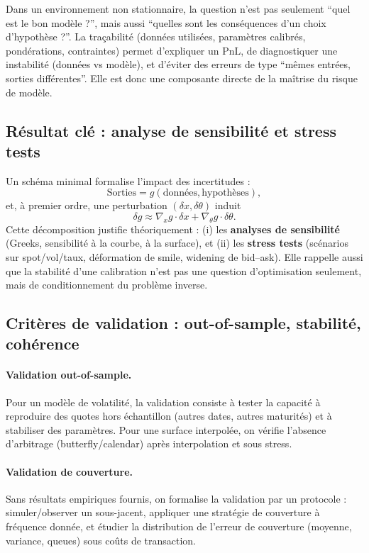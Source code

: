 \documentclass[11pt,a4paper]{article}
\newcommand{\1}{\mathbf{1}}
\begin{document}
Dans un environnement non stationnaire, la question n'est pas seulement ``quel est le bon mod\`ele ?'', mais aussi
``quelles sont les cons\'equences d'un choix d'hypoth\`ese ?''. La tra\c{c}abilit\'e (donn\'ees utilis\'ees, param\`etres calibr\'es,
pond\'erations, contraintes) permet d'expliquer un PnL, de diagnostiquer une instabilit\'e (donn\'ees vs mod\`ele), et d'\'eviter des erreurs
de type ``m\^emes entr\'ees, sorties diff\'erentes''. Elle est donc une composante directe de la ma\^{i}trise du risque de mod\`ele.

\subsection{R\'esultat cl\'e : analyse de sensibilit\'e et stress tests}

Un sch\'ema minimal formalise l'impact des incertitudes :
\[
\text{Sorties} = g(\text{donn\'ees},\text{hypoth\`eses}),
\]
et, \`a premier ordre, une perturbation $(\delta x,\delta\theta)$ induit
\[
\delta g \approx \nabla_x g \cdot \delta x + \nabla_\theta g \cdot \delta\theta.
\]
Cette d\'ecomposition justifie th\'eoriquement : (i) les \textbf{analyses de sensibilit\'e} (Greeks, sensibilit\'e \`a la courbe, \`a la surface),
et (ii) les \textbf{stress tests} (sc\'enarios sur spot/vol/taux, d\'eformation de smile, widening de bid--ask). Elle rappelle aussi que
la stabilit\'e d'une calibration n'est pas une question d'optimisation seulement, mais de conditionnement du probl\`eme inverse.

\subsection{Crit\`eres de validation : out-of-sample, stabilit\'e, coh\'erence}

\paragraph{Validation out-of-sample.}
Pour un mod\`ele de volatilité, la validation consiste \`a tester la capacit\'e \`a reproduire des quotes hors \'echantillon (autres dates,
autres maturit\'es) et \`a stabiliser des param\`etres. Pour une surface interpol\'ee, on v\'erifie l'absence d'arbitrage (butterfly/calendar)
après interpolation et sous stress.

\paragraph{Validation de couverture.}
Sans r\'esultats empiriques fournis, on formalise la validation par un protocole : simuler/observer un sous-jacent, appliquer une strat\'egie
de couverture \`a fr\'equence donn\'ee, et \'etudier la distribution de l'erreur de couverture (moyenne, variance, queues) sous co\^uts de transaction.
\end{document}
